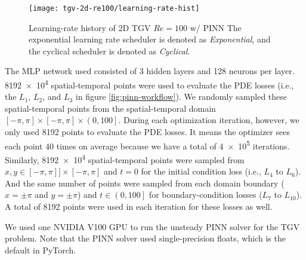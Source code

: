 \begin{figure}
    \centering%
    \texttt{[image: tgv-2d-re100/learning-rate-hist]}%
    \caption{%
        Learning-rate history of 2D TGV $Re=\num{100}$ w/ PINN
        The exponential learning rate scheduler is denoted as {\it Exponential}, and the cyclical scheduler is denoted as {\it Cyclical}.
    }
    \label{fig:tgv-learning-rate-hist}%
\end{figure}

The MLP network used consisted of \num{3} hidden layers and \num{128} neurons per layer.
\num{8192e4} spatial-temporal points were used to evaluate the PDE losses (i.e., the $L_1$, $L_2$, and $L_3$ in figure \ref{fig:pinn-workflow}).
We randomly sampled these spatial-temporal points from the spatial-temporal domain$\left[-\pi, \pi\right] \times \left[-\pi, \pi\right] \times \left(0, 100\right]$.
During each optimization iteration, however, we only used \num{8192} points to evaluate the PDE losses.
It means the optimizer sees each point \num{40} times on average because we have a total of \num{4e5} iterations.
Similarly, \num{8192e4} spatial-temporal points were sampled from $x,y \in \left[-\pi, \pi\right] ] \times \left[-\pi, \pi\right]$ and $t=0$ for the initial condition loss (i.e., $L_4$ to $L_6$).
And the same number of points were sampled from each domain boundary ($x=\pm\pi$ and $y=\pm\pi$) and $t\in\left(0, 100\right]$ for boundary-condition losses ($L_7$ to $L_{10}$).
A total of \num{8192} points were used in each iteration for these losses as well.

We used one NVIDIA V100 GPU to run the unsteady PINN solver for the TGV problem.
Note that the PINN solver used single-precision floats, which is the default in PyTorch.

